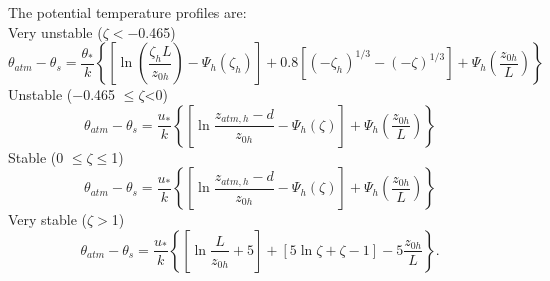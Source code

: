 \documentclass[12pt,authoryear]{elsarticle}
\numberwithin{equation}{section} %
\begin{document}
The potential temperature profiles are:\\
Very unstable ($\zeta<-$0.465)
\begin{equation}
\label{eq:potential_temperature_very_unstable}
\theta_{atm}-\theta_s=\frac{\theta_*}{k}
\left\{
\left[
\ln\left(\frac{\zeta_h L}{z_{0h}}\right)-\Psi_h(\zeta_h)
\right] + 0.8\left[(-\zeta_{h})^{1/3}-(-\zeta)^{1/3}
\right] + \Psi_{h}\left(\frac{z_{0h}}{L}\right)
\right\}
\end{equation}
Unstable ($-$0.465 $\leq \zeta$<0)
\begin{equation}
\theta_{atm}-\theta_{s}=\frac{u_*}{k}\left\{\left[\ln \frac{z_{atm,h}-d}{z_{0h}}-\Psi_{h}(\zeta)\right]+\Psi_{h}\left(\frac{z_{0h}}{L}\right)\right\}
\end{equation}
Stable (0 $\leq \zeta \leq$1)
\begin{equation}
\theta_{atm}-\theta_{s}= \frac{u_*}{k}\left\{\left[\ln \frac{z_{atm,h}-d}{z_{0h}}-\Psi_h(\zeta)\right]+\Psi_{h}\left(\frac{z_{0h}}{L}\right)\right\}
\end{equation}
Very stable ($\zeta>$1)
\begin{equation}
\theta_{atm}-\theta_{s}= \frac{u_*}{k}\left\{\left[\ln \frac{L}{z_{0h}}+5\right]+\left[5\ln\zeta+\zeta-1\right]-5\frac{z_{0h}}{L}\right\}.
\end{equation}
\end{document}
